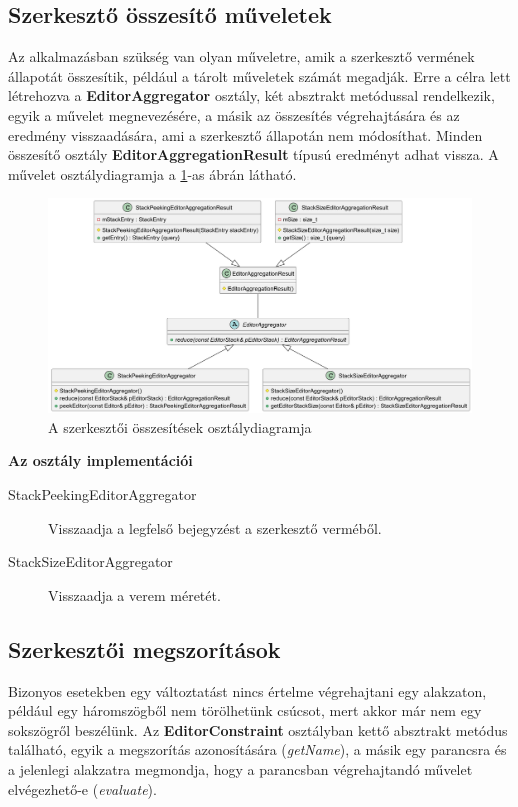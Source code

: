 \subsection{Szerkesztő összesítő műveletek}

Az alkalmazásban szükség van olyan műveletre, amik a szerkesztő vermének állapotát összesítik, például a tárolt műveletek számát megadják. Erre a célra lett létrehozva a \textbf{EditorAggregator} osztály, két absztrakt metódussal rendelkezik, egyik a művelet megnevezésére, a másik az összesítés végrehajtására és az eredmény visszaadására, ami a szerkesztő állapotán nem módosíthat. Minden összesítő osztály \textbf{EditorAggregationResult} típusú eredményt adhat vissza. A művelet osztálydiagramja a \ref{fig:class_editor_aggregator-1}-as ábrán látható.

\begin{figure}[H]
	\centering
	\includegraphics[width=1\linewidth]{images/class_editor_aggregator.png}
	\caption{A szerkesztői összesítések osztálydiagramja}
	\label{fig:class_editor_aggregator-1}
\end{figure}

\textbf{Az osztály implementációi}

\begin{description}
	\item[StackPeekingEditorAggregator] Visszaadja a legfelső bejegyzést a szerkesztő verméből.
	\item[StackSizeEditorAggregator] Visszaadja a verem méretét.
\end{description}

\subsection{Szerkesztői megszorítások}

Bizonyos esetekben egy változtatást nincs értelme végrehajtani egy alakzaton, például egy háromszögből nem törölhetünk csúcsot, mert akkor már nem egy sokszögről beszélünk. Az \textbf{EditorConstraint} osztályban kettő absztrakt metódus található, egyik a megszorítás azonosítására (\textit{getName}), a másik egy parancsra és a jelenlegi alakzatra megmondja, hogy a parancsban végrehajtandó művelet elvégezhető-e (\textit{evaluate}).

